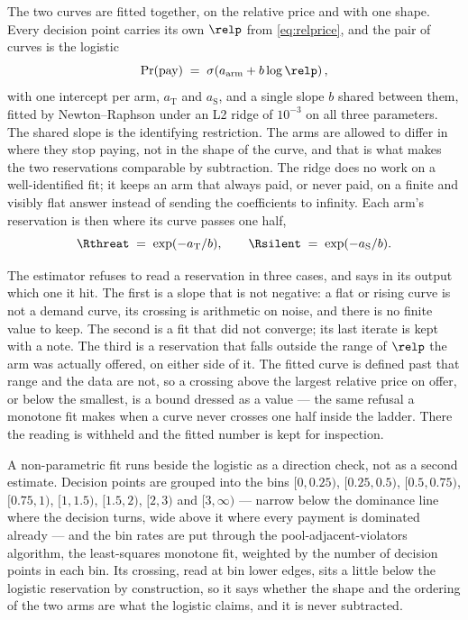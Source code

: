 The two curves are fitted together, on the relative price and with one shape. Every decision point carries its own $\relp$ from \eqref{eq:relprice}, and the pair of curves is the logistic
\begin{equation}\label{eq:logistic}
\Pr(\text{pay}) \;=\; \sigma\!\left(a_{\mathrm{arm}} + b \log \relp\right),
\end{equation}
with one intercept per arm, $a_{\mathrm{T}}$ and $a_{\mathrm{S}}$, and a single slope $b$ shared between them, fitted by Newton--Raphson under an L2 ridge of $10^{-3}$ on all three parameters. The shared slope is the identifying restriction. The arms are allowed to differ in where they stop paying, not in the shape of the curve, and that is what makes the two reservations comparable by subtraction. The ridge does no work on a well-identified fit; it keeps an arm that always paid, or never paid, on a finite and visibly flat answer instead of sending the coefficients to infinity. Each arm's reservation is then where its curve passes one half,
\begin{equation}\label{eq:rhostar}
\Rthreat \;=\; \exp(-a_{\mathrm{T}} / b), \qquad \Rsilent \;=\; \exp(-a_{\mathrm{S}} / b).
\end{equation}

The estimator refuses to read a reservation in three cases, and says in its output which one it hit. The first is a slope that is not negative: a flat or rising curve is not a demand curve, its crossing is arithmetic on noise, and there is no finite value to keep. The second is a fit that did not converge; its last iterate is kept with a note. The third is a reservation that falls outside the range of $\relp$ the arm was actually offered, on either side of it. The fitted curve is defined past that range and the data are not, so a crossing above the largest relative price on offer, or below the smallest, is a bound dressed as a value --- the same refusal a monotone fit makes when a curve never crosses one half inside the ladder. There the reading is withheld and the fitted number is kept for inspection.

A non-parametric fit runs beside the logistic as a direction check, not as a second estimate. Decision points are grouped into the bins $[0, 0.25)$, $[0.25, 0.5)$, $[0.5, 0.75)$, $[0.75, 1)$, $[1, 1.5)$, $[1.5, 2)$, $[2, 3)$ and $[3, \infty)$ --- narrow below the dominance line where the decision turns, wide above it where every payment is dominated already --- and the bin rates are put through the pool-adjacent-violators algorithm, the least-squares monotone fit, weighted by the number of decision points in each bin. Its crossing, read at bin lower edges, sits a little below the logistic reservation by construction, so it says whether the shape and the ordering of the two arms are what the logistic claims, and it is never subtracted.

